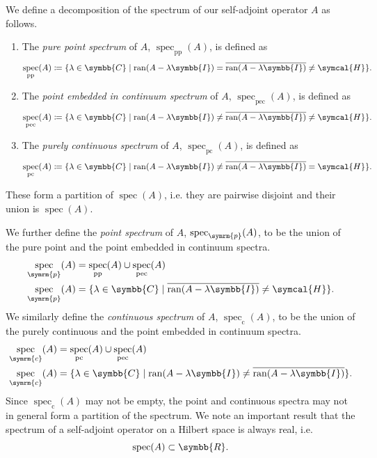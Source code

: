 \documentclass[11pt, a4paper]{article}
\theoremstyle{definition}
\newcommand{\rr}{\symbb{R}}
\newcommand{\cc}{\symbb{C}}
\newcommand{\hilbert}{\symcal{H}}
\newcommand{\identity}{\symbb{I}}
\DeclareMathOperator{\spec}{spec}
\begin{document}
    We define a decomposition of the spectrum of our self-adjoint operator $A$ as follows.
    \begin{enumerate}
        \item The \textit{pure point spectrum} of $A$, $\spec_\text{pp}(A)$, is defined as
        \[
        \spec_\text{pp}(A) \coloneq \{\lambda \in \cc \mid \operatorname{ran}(A - \lambda\identity) = \overline{\operatorname{ran}(A - \lambda\identity)} \neq \hilbert\}.
        \]
        \item The \textit{point embedded in continuum spectrum} of $A$, $\spec_{\text{pec}}(A)$, is defined as
        \[
        \spec_{\text{pec}}(A) \coloneq \{\lambda \in \cc \mid \operatorname{ran}(A - \lambda\identity) \neq \overline{\operatorname{ran}(A - \lambda\identity)} \neq \hilbert\}.
        \]
        \item The \textit{purely continuous spectrum} of $A$, $\spec_\text{pc}(A)$, is defined as
        \[
        \spec_\text{pc}(A) \coloneq \{\lambda \in \cc \mid \operatorname{ran}(A - \lambda\identity) \neq \overline{\operatorname{ran}(A - \lambda\identity)} = \hilbert\}.
        \]
    \end{enumerate}
    These form a partition of $\spec(A)$, i.e. they are pairwise disjoint and their union is $\spec(A)$.

    We further define the \textit{point spectrum} of $A$, $\spec_{\symrm{p}}(A)$, to be the union of the pure point and the point embedded in continuum spectra.
    \begin{align*}
        \spec_{\symrm{p}}(A) &=  \spec_\text{pp}(A) \cup \spec_{\text{pec}}(A)\\
        \spec_{\symrm{p}}(A) &= \{\lambda \in \cc \mid\overline{\operatorname{ran}(A - \lambda\identity)} \neq \hilbert\}.
    \end{align*}
    We similarly define the \textit{continuous spectrum} of $A$, $\spec_\text{c} (A)$, to be the union of the purely continuous and the point embedded in continuum spectra.
    \begin{align*}
        \spec_{\symrm{c}}(A) &=  \spec_\text{pc}(A) \cup \spec_{\text{pec}}(A)\\
        \spec_{\symrm{c}}(A) &= \{\lambda \in \cc \mid \operatorname{ran}(A - \lambda\identity) \neq \overline{\operatorname{ran}(A - \lambda\identity)}\}.
    \end{align*}
    Since $\spec_{\text{c}}(A)$ may not be empty, the point and continuous spectra may not in general form a partition of the spectrum. We note an important result that the spectrum of a self-adjoint operator on a Hilbert space is always real, i.e.
    \[
    \spec(A) \subset \rr.
    \]
\end{document}
